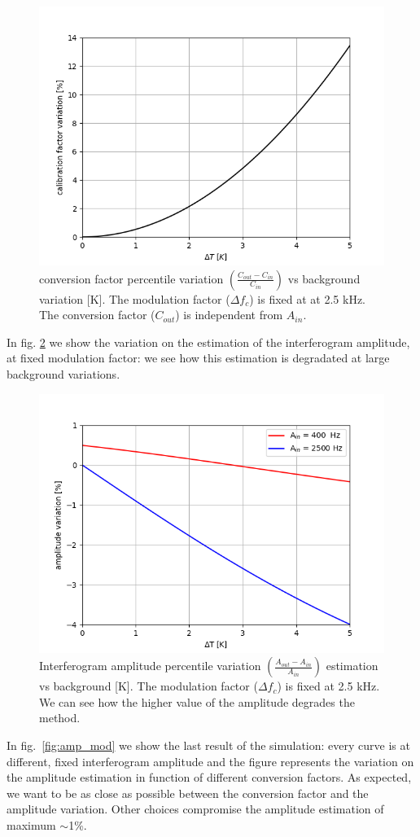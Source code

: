 \documentclass[twocolumn,traditabstract]{aa}\\
\begin{document}
\begin{figure}[htf]
	\centering
	\includegraphics[width=.5\textwidth]{3.acqui/calibration_factor_variation.png}
	\caption{conversion factor percentile variation $\left( \frac{C_{out}-C_{in}}{C_{in}} \right)$ vs background variation [K]. The modulation factor ($\Delta f_c$) is fixed at at 2.5 kHz. The conversion factor ($C_{out}$) is independent from $A_{in}$.}
	\label{fig:cal_bck}
\end{figure}

\noindent In fig. \ref{fig:amp_bck} we show the variation on the estimation of the interferogram amplitude, at fixed modulation factor: we see how this estimation is degradated at large background variations.

\begin{figure}[htf]
	\centering
	\includegraphics[width=.5\textwidth]{3.acqui/amplitude_variation.png}
	\caption{Interferogram amplitude percentile variation $\left( \frac{A_{out}-A_{in}}{A_{in}} \right)$ estimation vs background [K]. The modulation factor ($\Delta f_c$) is fixed at 2.5 kHz. We can see how the higher value of the amplitude degrades the method.}
	\label{fig:amp_bck}
\end{figure}

\noindent In fig.~\ref{fig:amp_mod} we show the last result of the simulation: every curve is at different, fixed interferogram amplitude and the figure represents the variation on the amplitude estimation in function of different conversion factors. As expected, we want to be as close as possible between the conversion factor and the amplitude variation. Other choices compromise the amplitude estimation of maximum $\sim$1\%.
\end{document}
